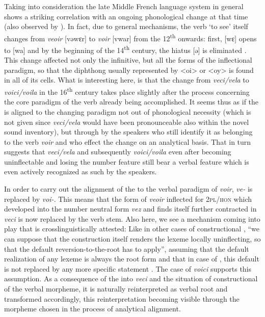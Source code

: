 \documentclass[output=paper,colorlinks,citecolor=brown]{langscibook}
\begin{document}
Taking into consideration the late Middle French language system in general shows a striking correlation with an ongoing phonological change at that time (also observed by \citealt[358]{tacke2022}). In fact, due to general  mechanisms, the verb `to see' itself changes from \emph{veoir} [vəwɛr] to \emph{voir} [vwar] from the 12\textsuperscript{th} onwards: first, [wɛ] opens to [wa] and by the beginning of the 14\textsuperscript{th} century, the hiatus [ə] is eliminated \citep[70]{andrieux-reix1995}. This change affected not only the infinitive, but all the forms of the inflectional paradigm, so that the diphthong usually represented by \textless oi\textgreater{} or \textless oy\textgreater{} is found in all of its cells. What is interesting here, is that the change from \emph{veci/vela} to \emph{voici/voila} in the 16\textsuperscript{th} century takes place slightly after the process concerning the core paradigm of the verb already being accomplished. It seems thus as if the  is aligned to the changing paradigm not out of phonological necessity (which is not given since \emph{veci/vela} would have been pronounceable also within the novel sound inventory), but through  by the speakers who still identify it as belonging to the verb \emph{voir} and who effect the change on an analytical basis. That in turn suggests that \emph{veci/vela} and subsequently \emph{voici/voila} even after becoming uninflectable and losing the number feature still bear a verbal feature which is even actively recognized as such by the speakers.

In order to carry out the alignment of the  to the verbal paradigm of \emph{voir}, \emph{ve-} is replaced by \emph{voi-}. This means that the form of \emph{veoir} inflected for \textsc{2pl/hon} which developed into the number neutral form \emph{vez} and finds itself further contracted in \emph{veci} is now replaced by the verb stem. Also here, we see a mechanism coming into play that is crosslinguistically attested: Like in other cases of constructional , ``we can suppose that the construction itself renders the lexeme locally uninflecting, so that the default reversion-to-the-root has to apply'', assuming that the default realization of any lexeme is always the root form and that in case of , this default is not replaced by any more specific statement \citep[156, 144]{spencer2020}. The case of \emph{voici} supports this assumption. As a consequence of the  into \emph{veci} and the situation of constructional  of the verbal morpheme, it is naturally reinterpreted as verbal root and transformed accordingly, this reinterpretation becoming visible through the morpheme chosen in the process of analytical alignment.
\end{document}
